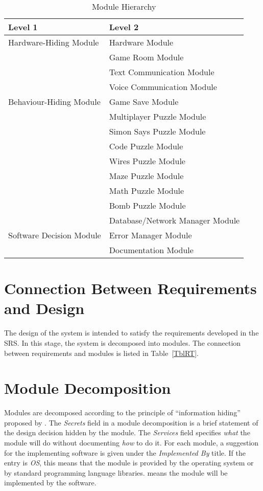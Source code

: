 \documentclass[12pt, titlepage]{article}
\begin{document}
\begin{table}[h!]
\centering
\begin{tabular}{p{} p{}}
\toprule
\textbf{Level 1} & \textbf{Level 2}\\
\midrule

{Hardware-Hiding Module} & Hardware Module \\
\midrule

\multirow{7}{0.3\textwidth}{Behaviour-Hiding Module}
& Game Room Module\\
& Text Communication Module\\
& Voice Communication Module\\
& Game Save Module\\
& Multiplayer Puzzle Module\\
& Simon Says Puzzle Module\\
& Code Puzzle Module\\
& Wires Puzzle Module\\
& Maze Puzzle Module\\
& Math Puzzle Module\\
& Bomb Puzzle Module\\
\midrule

\multirow{3}{0.3\textwidth}{Software Decision Module} & Database/Network Manager Module\\
& Error Manager Module\\
& Documentation Module\\
\bottomrule

\end{tabular}
\caption{Module Hierarchy}
\label{TblMH}
\end{table}

\newpage
\section{Connection Between Requirements and Design} \label{SecConnection}

The design of the system is intended to satisfy the requirements developed in
the SRS. In this stage, the system is decomposed into modules. The connection
between requirements and modules is listed in Table~\ref{TblRT}.

\section{Module Decomposition} \label{SecMD}

Modules are decomposed according to the principle of ``information hiding''
proposed by \citet{ParnasEtAl1984}. The \emph{Secrets} field in a module
decomposition is a brief statement of the design decision hidden by the
module. The \emph{Services} field specifies \emph{what} the module will do
without documenting \emph{how} to do it. For each module, a suggestion for the
implementing software is given under the \emph{Implemented By} title. If the
entry is \emph{OS}, this means that the module is provided by the operating
system or by standard programming language libraries.  \emph{\progname{}} means the
module will be implemented by the \progname{} software.
\end{document}
